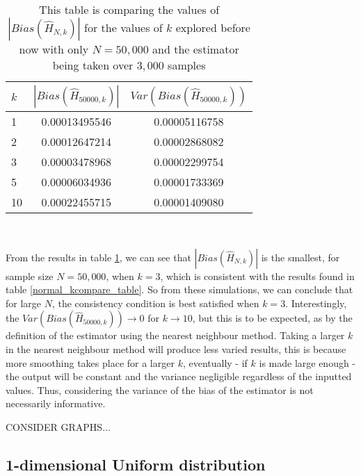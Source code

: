 \documentclass{article}
\begin{document}
\begin{table}
\caption{1-dimensional normal distribution, comparison of $k$} \label{normal_kcompare2_table}
\begin{center}
\begin{tabular}{| l | c c |} 
\toprule
$k$ &  $|Bias(\hat{H}_{50000, k})|$ & $Var(Bias(\hat{H}_{50000, k}))$ \\
\midrule[1pt]
1      & 0.00013495546     & 0.00005116758  \\
2      & 0.00012647214     & 0.00002868082  \\
3      & 0.00003478968     & 0.00002299754  \\
5      & 0.00006034936     & 0.00001733369  \\
10    & 0.00022455715     & 0.00001409080  \\
\hline
\end{tabular}
\\[10pt]
\caption*{This table is comparing the values of $|Bias(\hat{H}_{N, k})|$ for the values of $k$ explored before now with only $N=50,000$ and the estimator being taken over $3,000$ samples}
\end{center}
\end{table}

From the results in table \ref{normal_kcompare2_table}, we can see that  $|Bias(\hat{H}_{N, k})|$ is the smallest, for sample size $N=50,000$, when $k=3$, which is consistent with the results found in table \ref{normal_kcompare_table}. So from these simulations, we can conclude that for large $N$, the consistency condition is best satisfied when $k=3$. Interestingly, the $Var(Bias(\hat{H}_{50000, k})) \to 0$ for $k \to 10$, but this is to be expected, as by the definition of the estimator using the nearest neighbour method. Taking a larger $k$ in the nearest neighbour method will produce less varied results, this is because more smoothing takes place for a larger $k$, eventually - if $k$ is made large enough - the output will be constant and the variance negligible regardless of the inputted values. Thus, considering the variance of the bias of the estimator is not necessarily informative.

CONSIDER GRAPHS...

\subsection{1-dimensional Uniform distribution}
\end{document}
